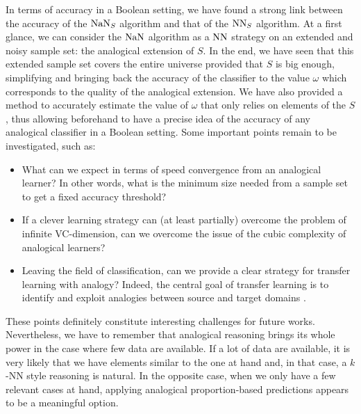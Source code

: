 In terms of accuracy in a Boolean setting, we have found a strong link between
the accuracy of the $\mbox{NaN}_S$ algorithm and that of the $\mbox{NN}_S$ algorithm. At a
first glance, we can consider the $\mbox{NaN}$ algorithm as a $\mbox{NN}$ strategy on an
extended and noisy sample set: the analogical extension of $S$. In the end, we
have seen that this extended sample set covers the entire universe provided
that $S$ is big enough, simplifying and bringing back the accuracy of the
classifier to the value $\omega$ which corresponds to the  quality of the
analogical extension. We have also provided a method to accurately estimate the
value of $\omega$ that only relies on elements of the $S$, thus allowing
beforehand to have a precise idea of the accuracy of any analogical classifier
in a Boolean setting. Some important points remain to be investigated, such as:
\begin{itemize}
\item What can we expect in terms of speed convergence from an analogical
  learner? In other words, what is the minimum size needed from a sample set to
  get a fixed accuracy threshold?
\item If a clever learning strategy can (at least partially) overcome the
  problem of infinite VC\mbox{-}dimension, can we overcome the issue of the
  cubic complexity of analogical learners?
\item Leaving the field of classification, can we provide a clear strategy for
  transfer learning with analogy? Indeed, the central goal of transfer
    learning is to identify and exploit analogies between source and target
    domains \cite{PanYanTKDE10}.
\end{itemize}
\noindent
These points definitely constitute interesting challenges for future works.
Nevertheless, we have to remember that analogical reasoning brings its whole
power in the case where few data are available. If a lot of data are available,
it is very likely that we have elements similar to the one at hand and, in that
case, a $k$-NN style reasoning is natural. In the opposite case, when we only
have a few relevant cases at hand, applying analogical proportion-based
predictions appears to be a meaningful option.
